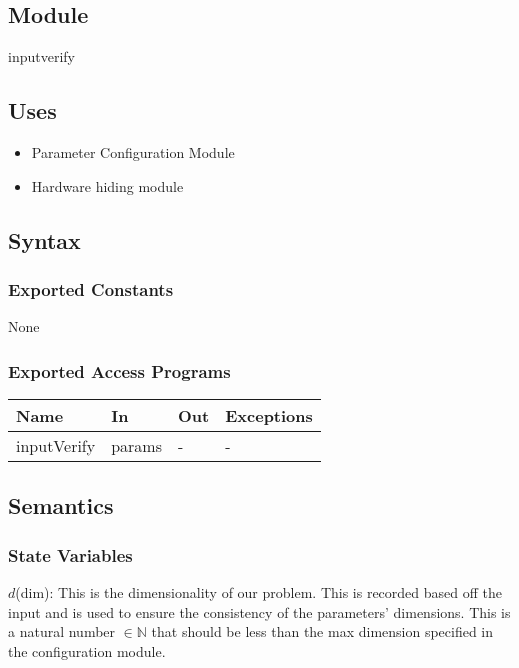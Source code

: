 \documentclass[12pt, titlepage]{article}
\begin{document}
\subsection{Module}
inputverify


\subsection{Uses}
\begin{itemize}
    \item Parameter Configuration Module
    \item Hardware hiding module
\end{itemize}

\subsection{Syntax}

\subsubsection{Exported Constants}
None
\subsubsection{Exported Access Programs}

\begin{center}
\begin{tabular}{p{2cm} p{4cm} p{4cm} p{2cm}}
\hline
\textbf{Name} & \textbf{In} & \textbf{Out} & \textbf{Exceptions} \\
\hline
inputVerify & params & - & - \\
\hline
\end{tabular}
\end{center}

\subsection{Semantics}
\subsubsection{State Variables}
$d$(dim): This is the dimensionality of our problem. This is recorded based off the input and is used to ensure the consistency of the parameters' dimensions. This is a natural number $\in \mathbb{N}$ that should be less than the max dimension specified in the configuration module.
\\
\end{document}
